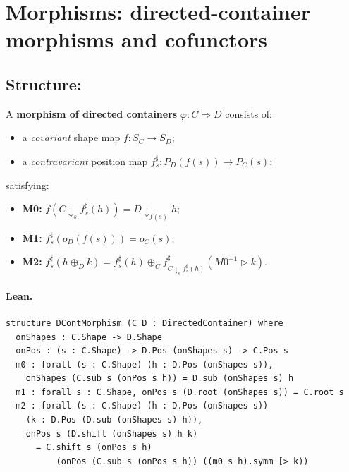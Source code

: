 \documentclass[11pt,a4paper]{article}
\begin{document}
\section{Morphisms: directed-container morphisms and cofunctors}

\subsection{Structure: }

\begin{defn}
A \textbf{morphism of directed containers} $\varphi : C \Rightarrow D$ consists
of:
\begin{itemize}
  \item a \emph{covariant} shape map $f : S_C \to S_D$;
  \item a \emph{contravariant} position map $f^\sharp_s : P_D(f(s)) \to P_C(s)$;
\end{itemize}
satisfying:
\begin{itemize}
  \item \textbf{M0:} $f(C \!\downarrow_s\! f^\sharp_s(h)) = D \!\downarrow_{f(s)}\! h$;
  \item \textbf{M1:} $f^\sharp_s(o_D(f(s))) = o_C(s)$;
  \item \textbf{M2:} $f^\sharp_s(h \oplus_D k) = f^\sharp_s(h) \oplus_C f^\sharp_{C \downarrow_s f^\sharp_s(h)}(M0^{-1} \triangleright k)$.
\end{itemize}
\end{defn}

\paragraph{Lean.}
\begin{lstlisting}[style=lean]
structure DContMorphism (C D : DirectedContainer) where
  onShapes : C.Shape -> D.Shape
  onPos : (s : C.Shape) -> D.Pos (onShapes s) -> C.Pos s
  m0 : forall (s : C.Shape) (h : D.Pos (onShapes s)),
    onShapes (C.sub s (onPos s h)) = D.sub (onShapes s) h
  m1 : forall s : C.Shape, onPos s (D.root (onShapes s)) = C.root s
  m2 : forall (s : C.Shape) (h : D.Pos (onShapes s))
    (k : D.Pos (D.sub (onShapes s) h)),
    onPos s (D.shift (onShapes s) h k)
      = C.shift s (onPos s h)
          (onPos (C.sub s (onPos s h)) ((m0 s h).symm [> k))
\end{lstlisting}
\end{document}
